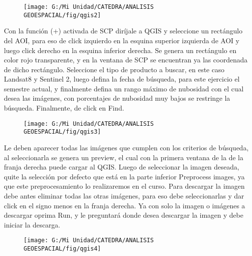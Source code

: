 \documentclass[a4paper,oneside,11pt,]{article}
\begin{document}
\begin{figure}
\centering
\texttt{[image: G:/Mi Unidad/CATEDRA/ANALISIS GEOESPACIAL/fig/qgis2]}
\end{figure}

Con la función (+) activada de SCP diríjale a QGIS y seleccione un rectángulo del AOI, para eso de click izquierdo en la esquina superior izquierda de AOI y luego click derecho en la esquina inferior derecha. Se genera un rectángulo en color rojo transparente, y en la ventana de SCP se encuentran ya las coordenada de dicho rectángulo. Seleccione el tipo de producto a buscar, en este caso Landsat8 y Sentinel 2, luego defina la fecha de búsqueda, para este ejercicio el semestre actual, y finalmente defina un rango máximo de nubosidad con el cual desea las imágenes, con porcentajes de nubosidad muy bajos se restringe la búsqueda. Finalmente, de click en Find.

\begin{figure}
\centering
\texttt{[image: G:/Mi Unidad/CATEDRA/ANALISIS GEOESPACIAL/fig/qgis3]}
\end{figure}

Le deben aparecer todas las imágenes que cumplen con los criterios de búsqueda, al seleccionarla se genera un preview, el cual con la primera ventana de la de la franja derecha puede cargar al QGIS. Luego de seleccionar la imagen deseada, quite la selección por defecto que está en la parte inferior Preprocess images, ya que este preprocesamiento lo realizaremos en el curso. Para descargar la imagen debe antes eliminar todas las otras imágenes, para eso debe seleccionarlas y dar click en el signo menos en la franja derecha. Ya con solo la imagen o imágenes a descargar oprima Run, y le preguntará donde desea descargar la imagen y debe iniciar la descarga.

\begin{figure}
\centering
\texttt{[image: G:/Mi Unidad/CATEDRA/ANALISIS GEOESPACIAL/fig/qgis4]}
\end{figure}
\end{document}
